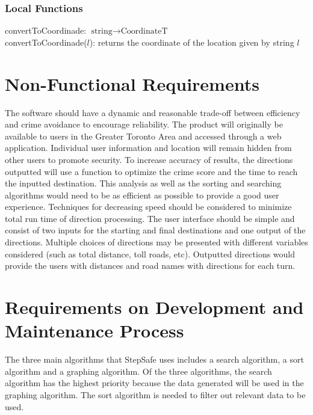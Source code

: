 \documentclass[12pt]{article}
\begin{document}
\subsubsection* {Local Functions}
\noindent convertToCoordinade: $\text{string} \rightarrow \text{CoordinateT}$\\
\noindent convertToCoordinade($l$): returns the coordinate of the location given by string $l$

\section {Non-Functional Requirements}
The software should have a dynamic and reasonable trade-off between efficiency and crime avoidance to encourage reliability. The product will originally be available to users in the Greater Toronto Area and accessed through a web application. Individual user information and location will remain hidden from other users to promote security. To increase accuracy of results, the directions outputted will use a function to optimize the crime score and the time to reach the inputted destination. This analysis as well as the sorting and searching algorithms would need to be as efficient as possible to provide a good user experience. Techniques for decreasing speed should be considered to minimize total run time of direction processing. The user interface should be simple and consist of two inputs for the starting and final destinations and one output of the directions. Multiple choices of directions may be presented with different variables considered (such as total distance, toll roads, etc). Outputted directions would provide the users with distances and road names with directions for each turn. 

\section {Requirements on Development and Maintenance Process}

The three main algorithms that StepSafe uses includes a search algorithm, a sort algorithm and a graphing algorithm. Of the three algorithms, the search algorithm has the highest priority because the data generated will be used in the graphing algorithm. The sort algorithm is needed to filter out relevant data to be used. \\
\end{document}
